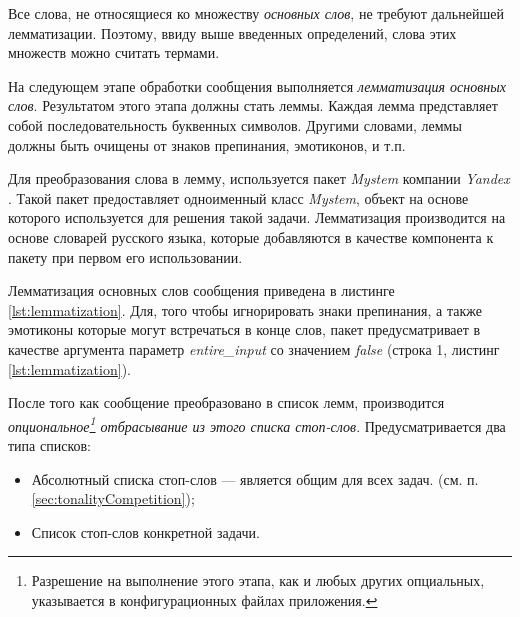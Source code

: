     \lstset{style=python}
    

    Все слова, не относящиеся ко множеству {\it основных слов}, не требуют
    дальнейшей лемматизации. Поэтому, ввиду выше введенных определений, слова
    этих множеств можно считать термами.

    На следующем этапе обработки сообщения выполняется {\it лемматизация основных слов}.
    Результатом этого этапа должны стать леммы.
    Каждая лемма представляет собой последовательность буквенных символов.
    Другими словами, леммы должны быть очищены от знаков препинания, эмотиконов,
    и т.п.

    Для преобразования слова в лемму, используется пакет {\it Mystem} компании
    {\it Yandex} \cite{mystem}.
    Такой пакет предоставляет одноименный класс {\it Mystem}, объект на основе
    которого используется для решения такой задачи.
    Лемматизация производится на основе словарей русского языка, которые
    добавляются в качестве компонента к пакету при первом его использовании.

    Лемматизация основных слов сообщения приведена в листинге \ref{lst:lemmatization}.
    Для, того чтобы игнорировать знаки препинания, а также эмотиконы которые
    могут встречаться в конце слов, пакет предусматривает в качестве аргумента
    параметр {\it entire\_input} со значением {\it false} (строка 1, листинг
    \ref{lst:lemmatization}).

    \lstset{style=python}
    

    После того как сообщение преобразовано в список лемм, производится
    {\it опциональное\footnote{
            Разрешение на выполнение этого этапа, как и любых других опциальных,
            указывается в конфигурационных файлах приложения.
        }
    отбрасывание из этого списка стоп-слов}.
    Предусматривается два типа списков:
    \begin{itemize}
        \item Абсолютный списка стоп-слов --- является общим для всех задач.
            (см. п. \ref{sec:tonalityCompetition});
        \item Список стоп-слов конкретной задачи.
    \end{itemize}

